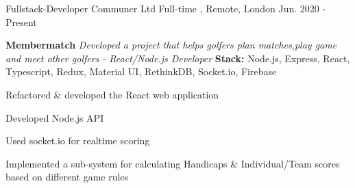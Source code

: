 


\begin{cventries}


\cventry
{Fullstack-Developer} %
{Communer Ltd} %
{Full-time , Remote, London} %
{Jun. 2020 - Present} %
{ %
\textcolor{awesome-red}{{\textbf{Membermatch}}}
\break
{\it Developed a project that helps golfers plan matches,play game and meet other golfers - React/Node.js Developer}
\break
{\textbf{ Stack:} }{Node.js, Express, React, Typescript, Redux, Material UI, RethinkDB, Socket.io, Firebase}
\break
\begin{cvitems}
\item {Refactored \& developed the React web application }
\item {Developed Node.js API}
\item {Used socket.io for realtime scoring}
\item {Implemented a sub-system for calculating Handicaps \& Individual/Team scores based on different game rules}
\end{cvitems}
}



\end{cventries}
